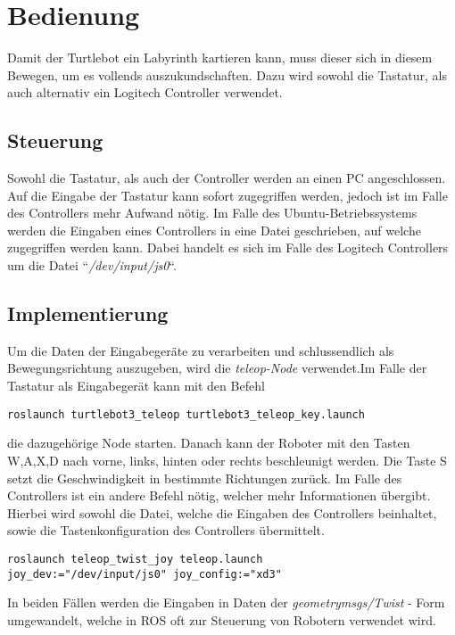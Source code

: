 \section{Bedienung}
{
	Damit der Turtlebot ein Labyrinth kartieren kann, muss dieser sich in diesem Bewegen, um es vollends auszukundschaften. Dazu wird sowohl die Tastatur, als auch alternativ ein Logitech Controller verwendet.
	
	\subsection{Steuerung}
	{
		Sowohl die Tastatur, als auch der Controller werden an einen PC angeschlossen. Auf die Eingabe der Tastatur kann sofort zugegriffen werden, jedoch ist im Falle des Controllers mehr Aufwand nötig. Im Falle des Ubuntu-Betriebssystems werden die Eingaben eines Controllers in eine Datei geschrieben, auf welche zugegriffen werden kann. Dabei handelt es sich im Falle des Logitech Controllers um die Datei ``\emph{/dev/input/js0}``.
	}

	\subsection{Implementierung}
	{ Um die Daten der Eingabegeräte zu verarbeiten und schlussendlich als Bewegungsrichtung auszugeben, wird die \emph{teleop-Node} verwendet.Im Falle der Tastatur als Eingabegerät kann mit den Befehl 
		\begin{lstlisting}
roslaunch turtlebot3_teleop turtlebot3_teleop_key.launch
		\end{lstlisting}
	die dazugehörige Node starten. Danach kann der Roboter mit den Tasten W,A,X,D nach vorne, links,  hinten oder rechts beschleunigt werden. Die Taste S setzt die Geschwindigkeit in bestimmte Richtungen zurück.
	\newline
	Im Falle des Controllers ist ein andere Befehl nötig, welcher mehr Informationen übergibt. Hierbei wird sowohl die Datei, welche die Eingaben des Controllers beinhaltet, sowie die Tastenkonfiguration des Controllers übermittelt.
	\begin{lstlisting}
roslaunch teleop_twist_joy teleop.launch 
joy_dev:="/dev/input/js0" joy_config:="xd3"
	\end{lstlisting}
	
	In beiden Fällen werden die Eingaben in Daten der \emph{geometry\textunderscore msgs/Twist} - Form umgewandelt, welche in ROS oft zur Steuerung von Robotern verwendet wird.
	}
}